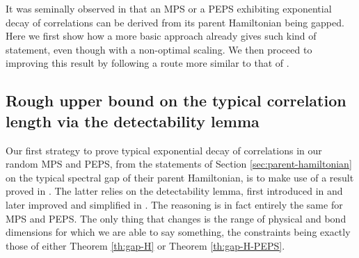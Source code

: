 \documentclass{amsart}
\begin{document}
\begin{figure}[h]
\begin{center}
    \end{center}
\end{figure}

It was seminally observed in \cite{HK} that an MPS or a PEPS exhibiting exponential decay of correlations can be derived from its parent Hamiltonian being gapped. Here we first show how a more basic approach already gives such kind of statement, even though with a non-optimal scaling. We then proceed to improving this result by following a route more similar to that of \cite{HK}.

\subsection{Rough upper bound on the typical correlation length via the detectability lemma} \hfill\par\smallskip

Our first strategy to prove typical exponential decay of correlations in our random MPS and PEPS, from the statements of Section \ref{sec:parent-hamiltonian} on the typical spectral gap of their parent Hamiltonian, is to make use of a result proved in \cite{GH}. The latter relies on the detectability lemma, first introduced in \cite{AALV} and later improved and simplified in \cite{AAV}. The reasoning is in fact entirely the same for MPS and PEPS. The only thing that changes is the range of physical and bond dimensions for which we are able to say something, the constraints being exactly those of either Theorem \ref{th:gap-H} or Theorem \ref{th:gap-H-PEPS}.
\end{document}
